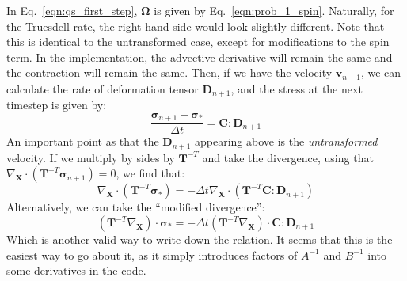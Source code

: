 \documentclass[11pt]{article}
\newcommand{\bsig}{\boldsymbol\sigma}
\newcommand{\bOmega}{\boldsymbol\Omega}
\newcommand{\bC}{\mathbf{C}}
\newcommand{\bD}{\mathbf{D}}
\newcommand{\bT}{\mathbf{T}}
\newcommand{\bX}{\mathbf{X}}
\begin{document}
In Eq.~\ref{eqn:qs_first_step}, $\bOmega$ is given by Eq.~\ref{eqn:prob_1_spin}. Naturally, for the Truesdell rate, the right hand side would look slightly different. Note that this is identical to the untransformed case, except for modifications to the spin term. In the implementation, the advective derivative will remain the same and the contraction will remain the same. Then, if we have the velocity $\mathbf{v}_{n+1}$, we can calculate the rate of deformation tensor $\bD_{n+1}$, and the stress at the next timestep is given by:
\begin{equation}
    \frac{\bsig_{n+1} - \bsig_*}{\Delta t} = \bC : \bD_{n+1}
    \label{eqn:qs_second_step}
\end{equation}
An important point as that the $\bD_{n+1}$ appearing above is the \emph{untransformed} velocity. If we multiply by sides by $\bT^{-T}$ and take the divergence, using that $\nabla_\bX\cdot(\bT^{-T}\bsig_{n+1})=0$, we find that:
\begin{equation}
    \nabla_\bX\cdot(\bT^{-T}\bsig_*) = -\Delta t \nabla_\bX\cdot\left(\bT^{-T}\bC:\bD_{n+1}\right)
\end{equation}
Alternatively, we can take the ``modified divergence'':
\begin{equation}
    \left(\bT^{-T}\nabla_\bX\right)\cdot \bsig_* = -\Delta t\left(\bT^{-T}\nabla_\bX\right)\cdot\bC:\bD_{n+1}
    \label{eqn:mg_eqn}
\end{equation}
Which is another valid way to write down the relation. It seems that this is the easiest way to go about it, as it simply introduces factors of $A^{-1}$ and $B^{-1}$ into some derivatives in the code.
\end{document}
